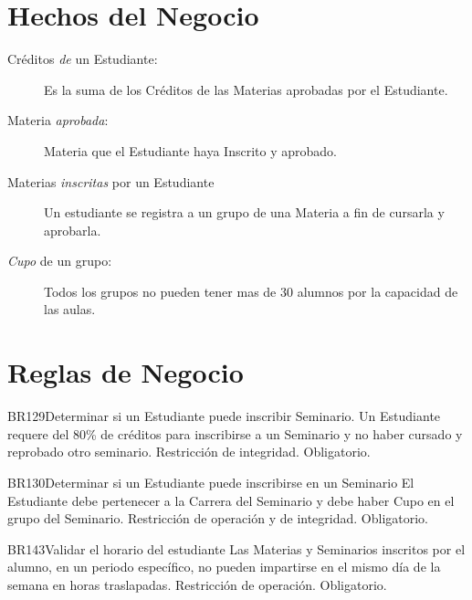 \section{Hechos del Negocio}

\begin{description}
	\item[Créditos {\em de} un Estudiante:] Es la suma de los Créditos de las Materias aprobadas por el Estudiante.
	\item[Materia {\em aprobada}:] Materia que el Estudiante haya Inscrito y aprobado.
	\item[Materias {\em inscritas} por un Estudiante] Un estudiante se registra a un grupo de una Materia a fin de cursarla y aprobarla.
	\item[{\em Cupo} de un grupo:] Todos los grupos no pueden tener mas de 30 alumnos por la capacidad de las aulas.
\end{description}

\section{Reglas de Negocio}

\begin{BussinesRule}{BR129}{Determinar si un Estudiante puede inscribir Seminario.} 
	\BRitem[Descripción:] Un Estudiante requere del 80\% de créditos para inscribirse a un Seminario y no haber cursado y reprobado otro seminario.
	\BRitem[Tipo:] Restricción de integridad.
	\BRitem[Nivel:] Obligatorio.
\end{BussinesRule}

\begin{BussinesRule}{BR130}{Determinar si un Estudiante puede inscribirse en un Seminario}
	\BRitem[Descripción:] El Estudiante debe pertenecer a la Carrera del Seminario y debe haber Cupo en el grupo del Seminario.
	\BRitem[Tipo:] Restricción de operación y de integridad.
	\BRitem[Nivel:] Obligatorio.
\end{BussinesRule}

\begin{BussinesRule}{BR143}{Validar el horario del estudiante}
	\BRitem[Descripción:] Las Materias y Seminarios inscritos por el alumno, en un periodo específico, no pueden impartirse en el mismo día de la semana en horas traslapadas.
	\BRitem[Tipo:] Restricción de operación.
	\BRitem[Nivel:] Obligatorio.
\end{BussinesRule}

